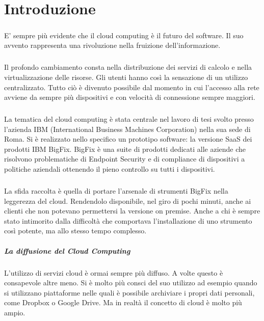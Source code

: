\chapter{Introduzione}

\paragraph{}
E' sempre più evidente che il cloud computing è il futuro del software. Il suo avvento rappresenta una rivoluzione nella fruizione dell'informazione.
\paragraph{}
Il profondo cambiamento consta nella distribuzione dei servizi di calcolo e nella virtualizzazione delle risorse. Gli utenti hanno così la sensazione di un utilizzo centralizzato. Tutto ciò è divenuto possibile dal momento in cui l'accesso alla rete avviene da sempre più dispositivi e con velocità di connessione sempre maggiori.
\paragraph{}
La tematica del cloud computing è stata centrale nel lavoro di tesi svolto presso l'azienda IBM (International Business Machines Corporation) nella sua sede di Roma. Si è realizzato nello specifico un prototipo software: la versione SaaS dei prodotti IBM BigFix. BigFix è una suite di prodotti dedicati alle aziende che risolvono problematiche di Endpoint Security e di compliance di dispositivi a politiche aziendali ottenendo il pieno controllo su tutti i dispositivi.
\paragraph{}
La sfida raccolta è quella di portare l'arsenale di strumenti BigFix nella leggerezza del cloud. Rendendolo disponibile, nel giro di pochi minuti, anche ai clienti che non potevano permettersi la versione on premise. Anche a chi è sempre stato intimorito dalla difficoltà che comportava l'installazione di uno strumento così potente, ma allo stesso tempo complesso.

\paragraph{La diffusione del Cloud Computing}
L'utilizzo di servizi cloud è ormai sempre più diffuso. A volte questo è consapevole altre meno. Si è molto più consci del suo utilizzo ad esempio quando si utilizzano piattaforme nelle quali è possibile archiviare i propri dati personali, come Dropbox o Google Drive. Ma in realtà il concetto di cloud è molto più ampio. 
